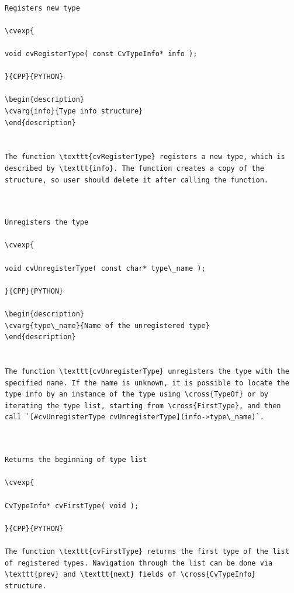 \label{RegisterType}
\begin{verbatim}

Registers new type

\cvexp{

void cvRegisterType( const CvTypeInfo* info );

}{CPP}{PYTHON}

\begin{description}
\cvarg{info}{Type info structure}
\end{description}


The function \texttt{cvRegisterType} registers a new type, which is described by \texttt{info}. The function creates a copy of the structure, so user should delete it after calling the function.


\end{verbatim}
\label{UnregisterType}
\begin{verbatim}

Unregisters the type

\cvexp{

void cvUnregisterType( const char* type\_name );

}{CPP}{PYTHON}

\begin{description}
\cvarg{type\_name}{Name of the unregistered type}
\end{description}


The function \texttt{cvUnregisterType} unregisters the type with the specified name. If the name is unknown, it is possible to locate the type info by an instance of the type using \cross{TypeOf} or by iterating the type list, starting from \cross{FirstType}, and then call `[#cvUnregisterType cvUnregisterType](info->type\_name)`.


\end{verbatim}
\label{FirstType}
\begin{verbatim}

Returns the beginning of type list

\cvexp{

CvTypeInfo* cvFirstType( void );

}{CPP}{PYTHON}

The function \texttt{cvFirstType} returns the first type of the list of registered types. Navigation through the list can be done via \texttt{prev} and \texttt{next} fields of \cross{CvTypeInfo} structure.


\end{verbatim}
